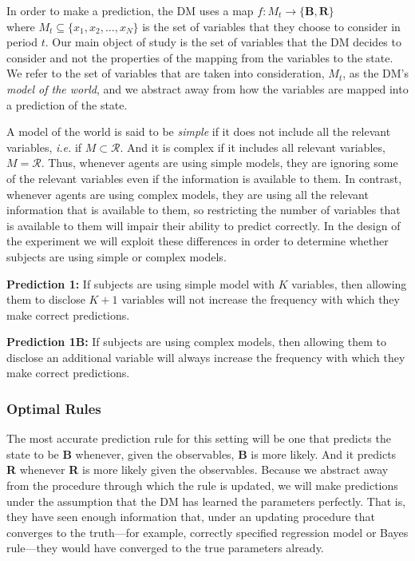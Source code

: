 \documentclass[
  12pt,
]{article}
\begin{document}
In order to make a prediction, the DM uses a map
\(f: M_t\to \{\textbf{B}, \textbf{R}\}\)\\
where \(M_t \subseteq \{x_1, x_2, ..., x_N\}\) is the set of variables
that they choose to consider in period \(t\). Our main object of study
is the set of variables that the DM decides to consider and not the
properties of the mapping from the variables to the state. We refer to
the set of variables that are taken into consideration, \(M_t\), as the
DM's \emph{model of the world}, and we abstract away from how the
variables are mapped into a prediction of the state.

A model of the world is said to be \emph{simple} if it does not include
all the relevant variables, \emph{i.e.} if \(M\subset \mathcal{R}\). And
it is complex if it includes all relevant variables, \(M=\mathcal{R}\).
Thus, whenever agents are using simple models, they are ignoring some of
the relevant variables even if the information is available to them. In
contrast, whenever agents are using complex models, they are using all
the relevant information that is available to them, so restricting the
number of variables that is available to them will impair their ability
to predict correctly. In the design of the experiment we will exploit
these differences in order to determine whether subjects are using
simple or complex models.

\textbf{Prediction 1:} If subjects are using simple model with \(K\)
variables, then allowing them to disclose \(K+1\) variables will not
increase the frequency with which they make correct predictions.

\textbf{Prediction 1B:} If subjects are using complex models, then
allowing them to disclose an additional variable will always increase
the frequency with which they make correct predictions.

\hypertarget{optimal-rules}{%
\subsubsection{Optimal Rules}\label{optimal-rules}}

The most accurate prediction rule for this setting will be one that
predicts the state to be \textbf{B} whenever, given the observables,
\textbf{B} is more likely. And it predicts \textbf{R} whenever
\textbf{R} is more likely given the observables. Because we abstract
away from the procedure through which the rule is updated, we will make
predictions under the assumption that the DM has learned the parameters
perfectly. That is, they have seen enough information that, under an
updating procedure that converges to the truth---for example, correctly
specified regression model or Bayes rule---they would have converged to
the true parameters already.
\end{document}
